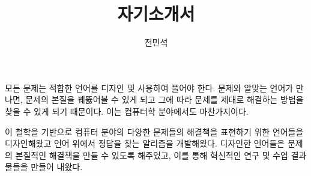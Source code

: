 \documentclass[11pt]{article}
\begin{document}
\title{자기소개서}

\author{전민석}



\newcommand{\DisjunctiveModel}{\textsc{Disjunctive Model}}
\newcommand{\FeatureLanguage}{\textsc{Feature Language}}
\newcommand{\GDL}{\textsc{Graph Description Language}}
\newcommand{\PLXGL}{\textsc{PL4XGL}}


\newcommand{\AbstractRelativeWritePattern}{\textsc{Abstract Relative Write Pattern}}

\maketitle 
\begin{spacing}{1.125}
모든 문제는 적합한 언어를 디자인 및 사용하여 풀어야 한다.
%
문제와 알맞는 언어가 만나면, 문제의 본질을 꿰뚫어볼 수 있게 되고 그에 따라 문제를 제대로 해결하는 방법을 찾을 수 있게 되기 때문이다.
%
이는 컴퓨터학 분야에서도 마찬가지이다.
%



%
이 철학을 기반으로 컴퓨터 분야의 다양한 문제들의 해결책을 표현하기 위한 언어들을 디자인해왔고 언어 위에서 정답을 찾는 알리즘을 개발해왔다.
%
디자인한 언어들은 문제의 본질적인 해결책을 만들 수 있도록 해주었고, 이를 통해 혁신적인 연구 및 수업 결과물들을 만들어 내왔다.
%

\end{spacing}




%
\end{document}
